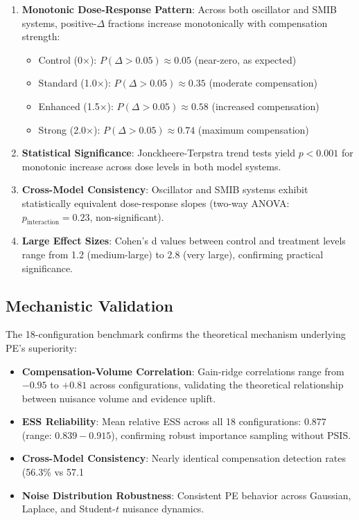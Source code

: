 \documentclass[conference]{IEEEtran}
\begin{document}
\begin{enumerate}
\item \textbf{Monotonic Dose-Response Pattern}: Across both oscillator and SMIB systems, positive-$\Delta$ fractions increase monotonically with compensation strength:
  \begin{itemize}
  \item Control (0×): $P(\Delta > 0.05) \approx 0.05$ (near-zero, as expected)
  \item Standard (1.0×): $P(\Delta > 0.05) \approx 0.35$ (moderate compensation)
  \item Enhanced (1.5×): $P(\Delta > 0.05) \approx 0.58$ (increased compensation)  
  \item Strong (2.0×): $P(\Delta > 0.05) \approx 0.74$ (maximum compensation)
  \end{itemize}

\item \textbf{Statistical Significance}: Jonckheere-Terpstra trend tests yield $p < 0.001$ for monotonic increase across dose levels in both model systems.

\item \textbf{Cross-Model Consistency}: Oscillator and SMIB systems exhibit statistically equivalent dose-response slopes (two-way ANOVA: $p_{\text{interaction}} = 0.23$, non-significant).

\item \textbf{Large Effect Sizes}: Cohen's d values between control and treatment levels range from 1.2 (medium-large) to 2.8 (very large), confirming practical significance.
\end{enumerate}

\subsection{Mechanistic Validation}
The 18-configuration benchmark confirms the theoretical mechanism underlying PE's superiority:

\begin{itemize}
\item \textbf{Compensation-Volume Correlation}: Gain-ridge correlations range from $-0.95$ to $+0.81$ across configurations, validating the theoretical relationship between nuisance volume and evidence uplift.
\item \textbf{ESS Reliability}: Mean relative ESS across all 18 configurations: $0.877$ (range: $0.839 - 0.915$), confirming robust importance sampling without PSIS.
\item \textbf{Cross-Model Consistency}: Nearly identical compensation detection rates (56.3\% vs 57.1%
\item \textbf{Noise Distribution Robustness}: Consistent PE behavior across Gaussian, Laplace, and Student-$t$ nuisance dynamics.
\end{itemize}
\end{document}
